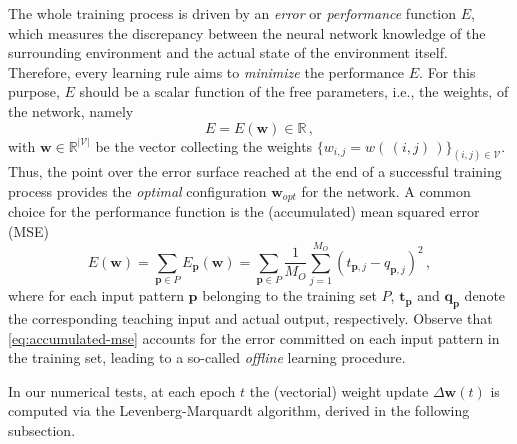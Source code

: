 \documentclass{elsarticle}
\numberwithin{equation}{section}
\theoremstyle{theorem}
\theoremstyle{definition}
\theoremstyle{remark}
\theoremstyle{proposition}
\numberwithin{figure}{section}
\begin{document}
		The whole training process is driven by an \emph{error} or \emph{performance} function $E$, which measures the discrepancy between the neural network knowledge of the surrounding environment and the actual state of the environment itself. %
		Therefore, every learning rule aims to \emph{minimize} the performance $E$. For this purpose, $E$ should be a scalar function of the free parameters, i.e., the weights, of the network, namely 
		\begin{equation*}
			\label{eq:performance-function}
			E = E(\mathbf{w}) \in \mathbb{R} \, , 
		\end{equation*}
		with $\mathbf{w} \in \mathbb{R}^{|\mathcal{V}|}$ be the vector collecting the weights $\big\lbrace w_{i,j} = w( \, (i,j) \, ) \big\rbrace_{(i,j) \in \mathcal{V}}$. Thus, the point over the error surface reached at the end of a successful training process provides the \emph{optimal} configuration $\mathbf{w}_{opt}$ for the network. A common choice for the performance function is the (accumulated) mean squared error (MSE)
		\begin{equation}
			\label{eq:accumulated-mse}
			E(\mathbf{w}) = \sum_{\mathbf{p} \in P} E_{\mathbf{p}}(\mathbf{w}) = \sum_{\mathbf{p} \in P} \dfrac{1}{M_O} \sum_{j = 1}^{M_O} \left( t_{\mathbf{p},j} - q_{\mathbf{p},j} \right)^2 \, ,
		\end{equation}
		where for each input pattern $\mathbf{p}$ belonging to the training set $P$, $\mathbf{t}_{\mathbf{p}}$ and $\mathbf{q}_{\mathbf{p}}$ denote the corresponding teaching input and actual output, respectively. Observe that \eqref{eq:accumulated-mse} accounts for the error committed on each input pattern in the training set, leading to a so-called \emph{offline} learning procedure.
		
		In our numerical tests, at each epoch $t$ the (vectorial) weight update $\Delta \mathbf{w}(t)$ is computed via the Levenberg-Marquardt algorithm, derived in the following subsection.
				
\end{document}
